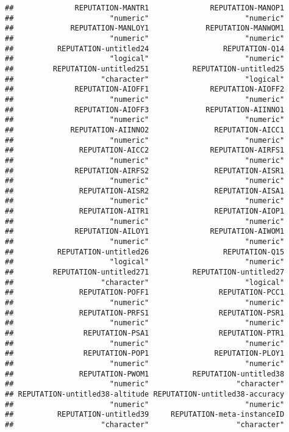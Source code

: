 \documentclass[
]{article}
\begin{document}
\begin{verbatim}
##              REPUTATION-MANTR1              REPUTATION-MANOP1 
##                      "numeric"                      "numeric" 
##             REPUTATION-MANLOY1             REPUTATION-MANWOM1 
##                      "numeric"                      "numeric" 
##          REPUTATION-untitled24                 REPUTATION-Q14 
##                      "logical"                      "numeric" 
##         REPUTATION-untitled251          REPUTATION-untitled25 
##                    "character"                      "logical" 
##              REPUTATION-AIOFF1              REPUTATION-AIOFF2 
##                      "numeric"                      "numeric" 
##              REPUTATION-AIOFF3             REPUTATION-AIINNO1 
##                      "numeric"                      "numeric" 
##             REPUTATION-AIINNO2               REPUTATION-AICC1 
##                      "numeric"                      "numeric" 
##               REPUTATION-AICC2              REPUTATION-AIRFS1 
##                      "numeric"                      "numeric" 
##              REPUTATION-AIRFS2               REPUTATION-AISR1 
##                      "numeric"                      "numeric" 
##               REPUTATION-AISR2               REPUTATION-AISA1 
##                      "numeric"                      "numeric" 
##               REPUTATION-AITR1               REPUTATION-AIOP1 
##                      "numeric"                      "numeric" 
##              REPUTATION-AILOY1              REPUTATION-AIWOM1 
##                      "numeric"                      "numeric" 
##          REPUTATION-untitled26                 REPUTATION-Q15 
##                      "logical"                      "numeric" 
##         REPUTATION-untitled271          REPUTATION-untitled27 
##                    "character"                      "logical" 
##               REPUTATION-POFF1                REPUTATION-PCC1 
##                      "numeric"                      "numeric" 
##               REPUTATION-PRFS1                REPUTATION-PSR1 
##                      "numeric"                      "numeric" 
##                REPUTATION-PSA1                REPUTATION-PTR1 
##                      "numeric"                      "numeric" 
##                REPUTATION-POP1               REPUTATION-PLOY1 
##                      "numeric"                      "numeric" 
##               REPUTATION-PWOM1          REPUTATION-untitled38 
##                      "numeric"                    "character" 
## REPUTATION-untitled38-altitude REPUTATION-untitled38-accuracy 
##                      "numeric"                      "numeric" 
##          REPUTATION-untitled39     REPUTATION-meta-instanceID 
##                    "character"                    "character"
\end{verbatim}
\end{document}
